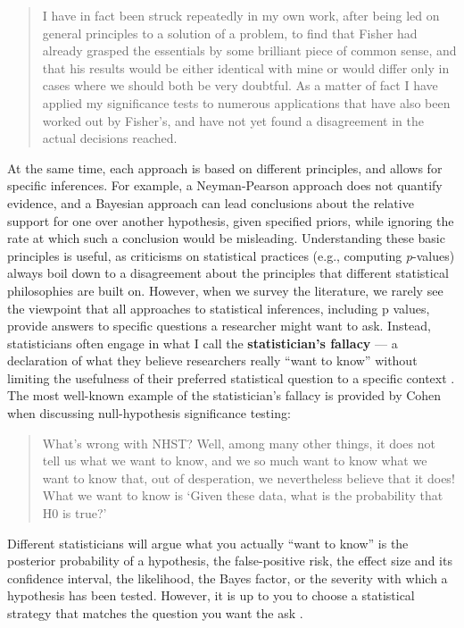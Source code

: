 \documentclass[
  oneside]{book}
\begin{document}
\begin{quote}
I have in fact been struck repeatedly in my own work, after being led on general principles to a solution of a problem, to find that Fisher had already grasped the essentials by some brilliant piece of common sense, and that his results would be either identical with mine or would differ only in cases where we should both be very doubtful. As a matter of fact I have applied my significance tests to numerous applications that have also been worked out by Fisher's, and have not yet found a disagreement in the actual decisions reached.
\end{quote}

At the same time, each approach is based on different principles, and allows for specific inferences. For example, a Neyman-Pearson approach does not quantify evidence, and a Bayesian approach can lead conclusions about the relative support for one over another hypothesis, given specified priors, while ignoring the rate at which such a conclusion would be misleading. Understanding these basic principles is useful, as criticisms on statistical practices (e.g., computing \emph{p}-values) always boil down to a disagreement about the principles that different statistical philosophies are built on. However, when we survey the literature, we rarely see the viewpoint that all approaches to statistical inferences, including p values, provide answers to specific questions a researcher might want to ask. Instead, statisticians often engage in what I call the \textbf{statistician's
fallacy} --- a declaration of what they believe researchers really ``want to know'' without limiting the usefulness of their preferred statistical question to a specific context \citep{lakens_practical_2021}. The most well-known example of the statistician's fallacy is provided by Cohen \citeyearpar{cohen_earth_1994} when discussing null-hypothesis significance testing:

\begin{quote}
What's wrong with NHST? Well, among many other things, it does not tell us what we want to know, and we so much want to know what we want to know that, out of desperation, we nevertheless believe that it does! What we want to know is `Given these data, what is the probability that H0 is true?'
\end{quote}

Different statisticians will argue what you actually ``want to know'' is the posterior probability of a hypothesis, the false-positive risk, the effect size and its confidence interval, the likelihood, the Bayes factor, or the severity with which a hypothesis has been tested. However, it is up to you to choose a statistical strategy that matches the question you want the ask \citep{hand_deconstructing_1994}.
\end{document}
